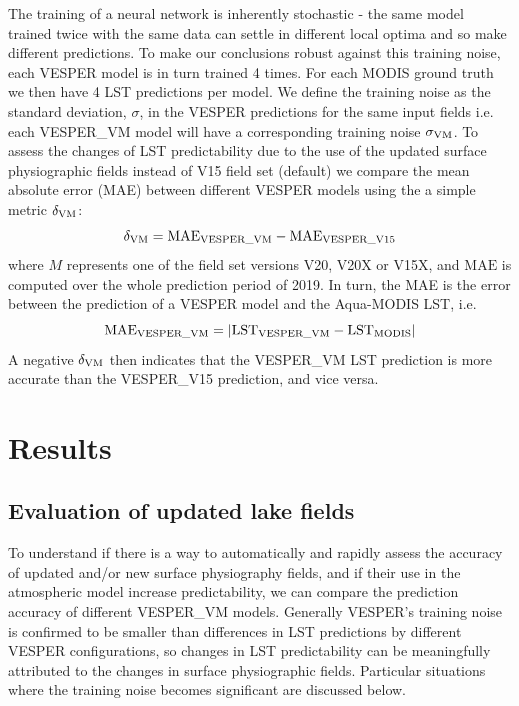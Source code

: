 \documentclass[hess, twostagejnl]{copernicus}
\begin{document}
The training of a neural network is inherently stochastic - the same model trained twice with the same data can settle in different local optima and so make different predictions. To make our conclusions robust against this training noise, each VESPER model is in turn trained 4 times. For each MODIS ground truth we then have 4 LST predictions per model. We define the training noise as the standard deviation, $\sigma$, in the VESPER predictions for the same input fields i.e. each VESPER\_VM model will have a corresponding training noise $\sigma_{\rm VM}$. To assess the changes of LST predictability due to the use of the updated surface physiographic fields instead of V15 field set (default) we compare the mean absolute error (MAE) between different VESPER models using the a simple metric $\delta_{\rm VM}$:
\begin{equation} 
	\delta_{\rm VM} = \text{MAE}_{\rm VESPER\_VM} - \text{MAE}_{\rm VESPER\_V15} 
\end{equation}
where $M$ represents one of the field set versions V20, V20X or V15X, and $\text{MAE}$ is computed over the whole prediction period of 2019. In turn, the MAE is the error between the prediction of a VESPER model and the Aqua-MODIS LST, i.e.
\begin{equation} 
	\text{MAE}_{\rm VESPER\_VM}  =| \text{LST}_{\rm VESPER\_VM} -\text{LST}_{\rm MODIS} |
\end{equation}
A negative $\delta_{\rm VM}$ then indicates that the VESPER\_VM LST prediction is more accurate than the  VESPER\_V15 prediction, and vice versa.
\section{Results}\label{sec:3}

\subsection{Evaluation of updated lake fields}
To understand if there is a way to automatically and rapidly assess the accuracy of updated and/or new surface physiography fields, and if their use in the atmospheric model increase predictability, we can compare the prediction accuracy of different VESPER\_VM models. Generally VESPER’s training noise is confirmed to be smaller than differences in LST predictions by different VESPER configurations, so changes in LST predictability can be meaningfully attributed to the changes in surface physiographic fields. Particular situations where the training noise becomes significant are discussed below. \newline 
\end{document}
